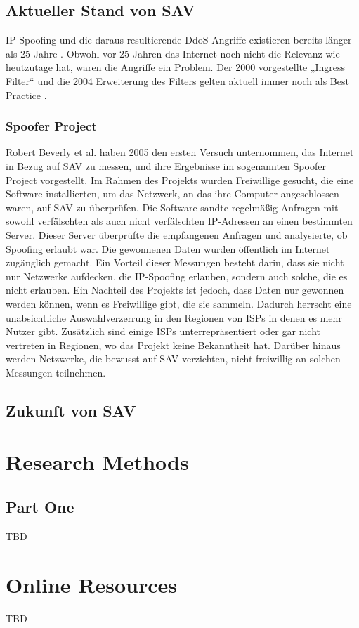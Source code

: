 \documentclass[sigplan,screen]{acmart}
\begin{document}
\subsection{Aktueller Stand von SAV}
IP-Spoofing und die daraus resultierende DdoS-Angriffe existieren bereits länger als 25 Jahre \cite{manrs01}. Obwohl vor 25 Jahren das Internet noch nicht die Relevanz wie heutzutage hat, waren die Angriffe ein Problem. Der 2000 vorgestellte „Ingress Filter“ \cite{Ingress01} und die 2004 Erweiterung des Filters \cite{BCP78} gelten aktuell immer noch als Best Practice \cite{CRP01} \cite{Lone01} \cite{Hal01} \cite{manrs01}.  

\subsubsection{Spoofer Project}
Robert Beverly et al. \cite{Spoofer01} haben 2005 den ersten Versuch unternommen, das Internet in Bezug auf SAV zu messen, und ihre Ergebnisse im sogenannten Spoofer Project vorgestellt. Im Rahmen des Projekts wurden Freiwillige gesucht, die eine Software installierten, um das Netzwerk, an das ihre Computer angeschlossen waren, auf SAV zu überprüfen. Die Software sandte regelmäßig Anfragen mit sowohl verfälschten als auch nicht verfälschten IP-Adressen an einen bestimmten Server. Dieser Server überprüfte die empfangenen Anfragen und analysierte, ob Spoofing erlaubt war. Die gewonnenen Daten wurden öffentlich im Internet zugänglich gemacht. Ein Vorteil dieser Messungen besteht darin, dass sie nicht nur Netzwerke aufdecken, die IP-Spoofing erlauben, sondern auch solche, die es nicht erlauben. Ein Nachteil des Projekts ist jedoch, dass Daten nur gewonnen werden können, wenn es Freiwillige gibt, die sie sammeln. Dadurch herrscht eine unabsichtliche Auswahlverzerrung in den Regionen von ISPs in denen es mehr Nutzer gibt. Zusätzlich sind einige ISPs unterrepräsentiert oder gar nicht vertreten in Regionen, wo das Projekt keine Bekanntheit hat. Darüber hinaus werden Netzwerke, die bewusst auf SAV verzichten, nicht freiwillig an solchen Messungen teilnehmen.

\subsection{Zukunft von SAV}



\appendix

\section{Research Methods}

\subsection{Part One}

TBD


\section{Online Resources}

TBD
\end{document}
